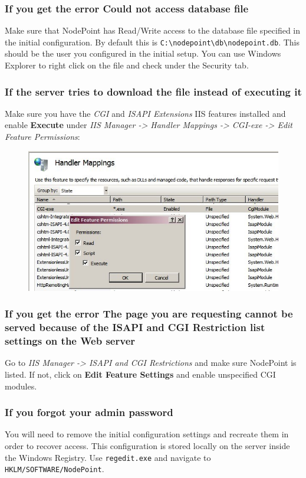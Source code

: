 \documentclass[11pt]{article}
\begin{document}
{\subsubsection{If you get the error Could not access database file}

Make sure that NodePoint has Read/Write access to the database file specified in the initial configuration. By default this is \texttt{C:\textbackslash nodepoint\textbackslash db\textbackslash nodepoint.db}. This should be the user you configured in the initial setup. You can use Windows Explorer to right click on the file and check under the Security tab.

\subsubsection{If the server tries to download the file instead of executing it}

Make sure you have the \textit{CGI} and \textit{ISAPI Extensions} IIS features installed and enable \textbf{Execute} under \textit{IIS Manager -> Handler Mappings -> CGI-exe -> Edit Feature Permissions}:

\begin{figure}[h]
\includegraphics{handlermapping.jpg}
\end{figure}

\subsubsection{If you get the error The page you are requesting cannot be served because of the ISAPI and CGI Restriction list settings on the Web server}

Go to \textit{IIS Manager -> ISAPI and CGI Restrictions} and make sure NodePoint is listed. If not, click on \textbf{Edit Feature Settings} and enable unspecified CGI modules.

\subsubsection{If you forgot your admin password}

You will need to remove the initial configuration settings and recreate them in order to recover access. This configuration is stored locally on the server inside the Windows Registry. Use \texttt{regedit.exe} and navigate to \texttt{HKLM/SOFTWARE/NodePoint}.
}
\end{document}
